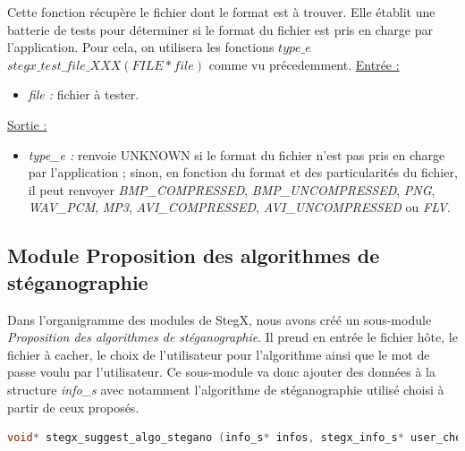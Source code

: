\documentclass[11pt]{article}
\begin{document}
Cette fonction récupère le fichier dont le format est à trouver. Elle établit une 
batterie de tests pour déterminer si le format du fichier est pris en charge 
par l'application. 
Pour cela, on utilisera les fonctions 
$type\_e$ $stegx\_test\_file\_XXX (FILE* file)$ comme vu précedemment. 
\newline
\underline{Entrée :} 
\begin{itemize}
\item \textit{file :} fichier à tester. 
\end{itemize}
\underline{Sortie :} 
\begin{itemize}
\item \textit{type\_e :} renvoie UNKNOWN si le format du fichier n'est pas pris en 
charge par l'application ; sinon, en fonction du format et des particularités 
du fichier, il peut renvoyer \textit{BMP\_COMPRESSED}, \textit{BMP\_UNCOMPRESSED}, 
\textit{PNG}, \textit{WAV\_PCM}, \textit{MP3}, \textit{AVI\_COMPRESSED}, 
\textit{AVI\_UNCOMPRESSED} ou \textit{FLV}. 
\newline 
\end{itemize}

\subsection{Module Proposition des algorithmes 
de stéganographie}

Dans l'organigramme des modules de StegX, nous avons créé un sous-module 
\textit{Proposition des algorithmes de stéganographie}. Il prend en entrée 
le fichier hôte, le fichier à cacher, le choix de l'utilisateur pour 
l'algorithme ainsi que le mot de passe voulu par l'utilisateur. 
Ce sous-module va donc ajouter des données à la structure \textit{info\_s} 
avec notamment l'algorithme de stéganographie utilisé choisi à partir de ceux 
proposés. 

\begin{lstlisting}[language=c]
void* stegx_suggest_algo_stegano (info_s* infos, stegx_info_s* user_choices);
\end{lstlisting}
\end{document}
